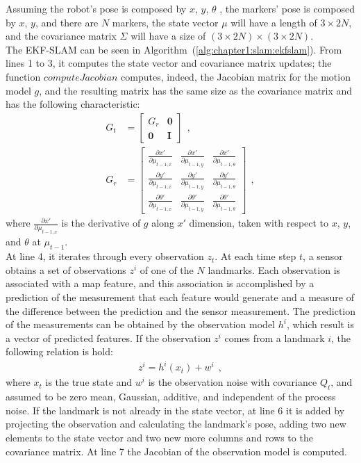 Assuming the robot's pose is composed by $x$, $y$, $\theta$ , the markers' pose is composed by $x$, $y$, and there are $N$ markers, the state vector $\mu$ will have a length of $3 \times 2N$, and the covariance matrix $\Sigma$ will have a size of $(3 \times 2N) \times (3 \times 2N)$.\\

The EKF-SLAM can be seen in Algorithm~(\ref{alg:chapter1:slam:ekfslam}). From lines 1 to 3, it computes the state vector and covariance matrix updates; the function $computeJacobian$ computes, indeed, the Jacobian matrix for the motion model $g$, and the resulting matrix has the same size as the covariance matrix and has the following characteristic:
\begin{align}
   G_t &= \begin{bmatrix}
        G_r & \textbf{0} \\
        \textbf{0} & \textbf{I}
    \end{bmatrix}~~,\\
    G_r &= \begin{bmatrix}
    \frac{\partial x'}{\partial \mu_{t-1,x}} & \frac{\partial x'}{\partial \mu_{t-1,y}} & \frac{\partial x'}{\partial \mu_{t-1,\theta}}\\
    \frac{\partial y'}{\partial \mu_{t-1,x}} & \frac{\partial y'}{\partial \mu_{t-1,y}} & \frac{\partial y'}{\partial \mu_{t-1,\theta}}\\
    \frac{\partial \theta'}{\partial \mu_{t-1,x}} & \frac{\partial \theta'}{\partial \mu_{t-1,y}} & \frac{\partial \theta'}{\partial \mu_{t-1,\theta}}
\end{bmatrix}~~,
\end{align}
where $\frac{\partial x'}{\partial \mu_{t-1,x}}$ is the derivative of $g$ along $x'$ dimension, taken with respect to $x$, $y$, and $\theta$ at $\mu_{t-1}$.\\

At line 4, it iterates through every observation $z_t$. At each time step $t$, a sensor obtains a set of observations $z^i$ of one of the $N$ landmarks. Each observation is associated with a map feature, and this association is accomplished by a prediction of the measurement that each feature would generate and a measure of the difference between the prediction and the sensor measurement. The prediction of the measurements can be obtained by the observation model $h^i$, which result is a vector of predicted features. If the observation $z^i$ comes from a landmark $i$, the following relation is hold:
\begin{align}
    z^i = h^i\left(x_t\right) + w^i~~,
\end{align}
where $x_t$ is the true state and $w^i$ is the observation noise with covariance $Q_t$, and assumed to be zero mean, Gaussian, additive, and independent of the process noise. If the landmark is not already in the state vector, at line 6 it is added by projecting the observation and calculating the landmark's pose, adding two new elements to the state vector and two new more columns and rows to the covariance matrix. At line 7 the Jacobian of the observation model is computed.\\


